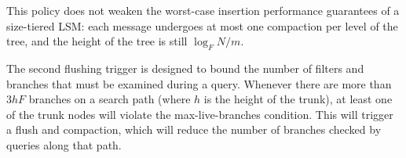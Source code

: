 This policy does not weaken the worst-case insertion performance
guarantees of a size-tiered LSM: each message undergoes at most one
compaction per level of the tree, and the height of the tree is still
$\log_F N/m$.

The second flushing trigger is designed to bound the number of filters and
branches that must be examined during a query.  Whenever there are more than
$3hF$ branches on a search path (where $h$ is the height of the trunk), at
least one of the trunk nodes will violate the max-live-branches condition.
This will trigger a flush and compaction, which will reduce the number of
branches checked by queries along that path.
